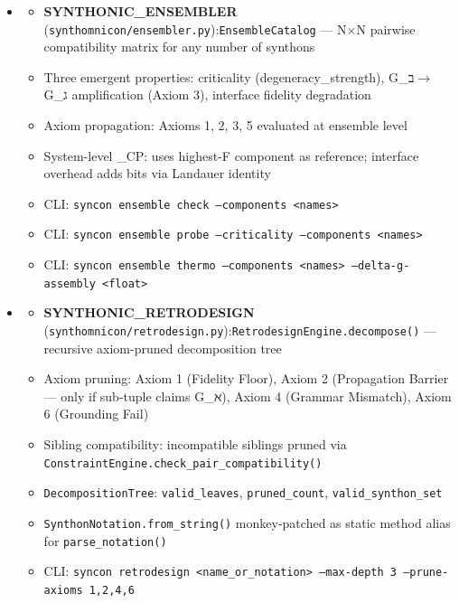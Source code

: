 \documentclass[12pt,a4paper]{article}
\begin{document}
\begin{itemize}
\begin{itemize}
    \item 
    \begin{itemize}
    \item \textbf{SYNTHONIC\_ENSEMBLER} (\texttt{synthomnicon/ensembler.py}):\texttt{EnsembleCatalog} --- N$\times$N pairwise compatibility matrix for any number of synthons
    \item Three emergent properties: criticality (degeneracy\_strength), G\_ב$\rightarrow$G\_ג amplification (Axiom 3), interface fidelity degradation
    \item Axiom propagation: Axioms 1, 2, 3, 5 evaluated at ensemble level
    \item System-level \xi\_CP: uses highest-F component as reference; interface overhead adds bits via Landauer identity
    \item CLI: \texttt{syncon ensemble check --components \textless{}names\textgreater{}}
    \item CLI: \texttt{syncon ensemble probe --criticality --components \textless{}names\textgreater{}}
    \item CLI: \texttt{syncon ensemble thermo --components \textless{}names\textgreater{} --delta-g-assembly \textless{}float\textgreater{}}
\end{itemize}

    \item 
    \begin{itemize}
    \item \textbf{SYNTHONIC\_RETRODESIGN} (\texttt{synthomnicon/retrodesign.py}):\texttt{RetrodesignEngine.decompose()} --- recursive axiom-pruned decomposition tree
    \item Axiom pruning: Axiom 1 (Fidelity Floor), Axiom 2 (Propagation Barrier --- only if sub-tuple claims G\_ℵ), Axiom 4 (Grammar Mismatch), Axiom 6 (Grounding Fail)
    \item Sibling compatibility: incompatible siblings pruned via \texttt{ConstraintEngine.check\_pair\_compatibility()}
    \item \texttt{DecompositionTree}: \texttt{valid\_leaves}, \texttt{pruned\_count}, \texttt{valid\_synthon\_set}
    \item \texttt{SynthonNotation.from\_string()} monkey-patched as static method alias for \texttt{parse\_notation()}
    \item CLI: \texttt{syncon retrodesign \textless{}name\_or\_notation\textgreater{} --max-depth 3 --prune-axioms 1,2,4,6}
\end{itemize}


\end{itemize}
\end{itemize}
\end{document}
